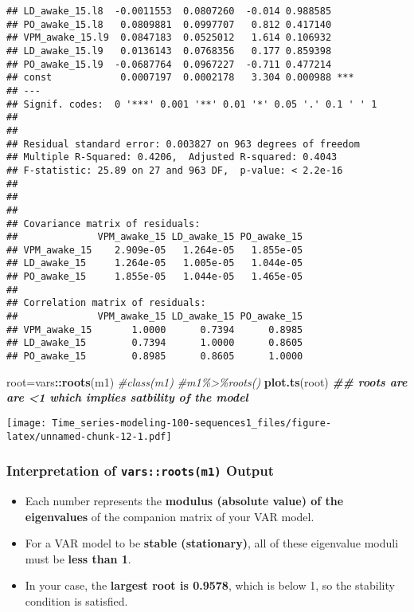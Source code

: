 \documentclass[
]{article}
\newenvironment{Shaded}{\begin{snugshade}}{\end{snugshade}}
\newcommand{\CommentTok}[1]{\textcolor[rgb]{0.56,0.35,0.01}{\textit{#1}}}
\newcommand{\DocumentationTok}[1]{\textcolor[rgb]{0.56,0.35,0.01}{\textbf{\textit{#1}}}}
\newcommand{\FunctionTok}[1]{\textcolor[rgb]{0.13,0.29,0.53}{\textbf{#1}}}
\newcommand{\NormalTok}[1]{#1}
\newcommand{\OtherTok}[1]{\textcolor[rgb]{0.56,0.35,0.01}{#1}}
\newcommand{\SpecialCharTok}[1]{\textcolor[rgb]{0.81,0.36,0.00}{\textbf{#1}}}
\providecommand{\tightlist}{%
  \setlength{\itemsep}{0pt}\setlength{\parskip}{0pt}}
\begin{document}
\begin{verbatim}
## LD_awake_15.l8  -0.0011553  0.0807260  -0.014 0.988585    
## PO_awake_15.l8   0.0809881  0.0997707   0.812 0.417140    
## VPM_awake_15.l9  0.0847183  0.0525012   1.614 0.106932    
## LD_awake_15.l9   0.0136143  0.0768356   0.177 0.859398    
## PO_awake_15.l9  -0.0687764  0.0967227  -0.711 0.477214    
## const            0.0007197  0.0002178   3.304 0.000988 ***
## ---
## Signif. codes:  0 '***' 0.001 '**' 0.01 '*' 0.05 '.' 0.1 ' ' 1
## 
## 
## Residual standard error: 0.003827 on 963 degrees of freedom
## Multiple R-Squared: 0.4206,  Adjusted R-squared: 0.4043 
## F-statistic: 25.89 on 27 and 963 DF,  p-value: < 2.2e-16 
## 
## 
## 
## Covariance matrix of residuals:
##              VPM_awake_15 LD_awake_15 PO_awake_15
## VPM_awake_15    2.909e-05   1.264e-05   1.855e-05
## LD_awake_15     1.264e-05   1.005e-05   1.044e-05
## PO_awake_15     1.855e-05   1.044e-05   1.465e-05
## 
## Correlation matrix of residuals:
##              VPM_awake_15 LD_awake_15 PO_awake_15
## VPM_awake_15       1.0000      0.7394      0.8985
## LD_awake_15        0.7394      1.0000      0.8605
## PO_awake_15        0.8985      0.8605      1.0000
\end{verbatim}

\begin{Shaded}
\begin{Highlighting}[]
\NormalTok{root}\OtherTok{=}\NormalTok{vars}\SpecialCharTok{::}\FunctionTok{roots}\NormalTok{(m1)}
\CommentTok{\#class(m1)}
\CommentTok{\#m1\%\textgreater{}\%roots()}
\FunctionTok{plot.ts}\NormalTok{(root)  }\DocumentationTok{\#\# roots are are \textless{}1 which implies satbility of the model}
\end{Highlighting}
\end{Shaded}

\texttt{[image: Time\_series-modeling-100-sequences1\_files/figure-latex/unnamed-chunk-12-1.pdf]}

\hypertarget{interpretation-of-varsrootsm1-output}{%
\subsubsection{\texorpdfstring{Interpretation of
\texttt{vars::roots(m1)}
Output}{Interpretation of vars::roots(m1) Output}}\label{interpretation-of-varsrootsm1-output}}

\begin{itemize}
\tightlist
\item
  Each number represents the \textbf{modulus (absolute value) of the
  eigenvalues} of the companion matrix of your VAR model.
\item
  For a VAR model to be \textbf{stable (stationary)}, all of these
  eigenvalue moduli must be \textbf{less than 1}.
\item
  In your case, the \textbf{largest root is 0.9578}, which is below 1,
  so the stability condition is satisfied.
\end{itemize}
\end{document}
